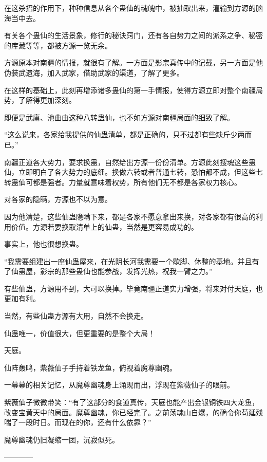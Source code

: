 \begin{this_body}
在这杀招的作用下，种种信息从各个蛊仙的魂魄中，被抽取出来，灌输到方源的脑海当中去。

有关各个蛊仙的生活景象，修行的秘诀窍门，还有各自势力之间的派系之争、秘密的库藏等等，都被方源一览无余。

方源原本对南疆的情报，就很有了解。一方面是影宗真传中的记载，另一方面是他伪装武遗海，加入武家，借助武家的渠道，了解了更多。

在这样的基础上，此刻再增添诸多蛊仙的第一手情报，使得方源立即对整个南疆局势，了解得更加深刻。

即便是武庸、池曲由这种八转蛊仙，也不如方源对南疆局面的细致了解。

“这么说来，各家给我提供的仙蛊清单，都是正确的，只不过都有些缺斤少两而已。”

南疆正道各大势力，要求换蛊，自然给出方源一份份清单。方源此刻搜魂这些蛊仙，立即明白了各大势力的底细。换做六转或者普通七转，恐怕都不成，但这些七转蛊仙可都是强者。力量就意味着权势，所有他们无不都是各家权力核心。

对各家的隐瞒，方源也不以为意。

因为他清楚，这些仙蛊隐瞒下来，都是各家不愿意拿出来换，对各家都有很高的利用价值。方源若要换取清单上的仙蛊，当然是更容易成功的。

事实上，他也很想换蛊。

“我需要组建出一座仙蛊屋来，在光阴长河我需要一个歇脚、休整的基地。并且有了仙蛊屋，影宗的那些蛊仙也能参战，发挥光热，祝我一臂之力。”

有些仙蛊，方源用不到，大可以换掉。毕竟南疆正道实力增强，将来对付天庭，也更加有利。

当然，有些仙蛊方源有大用，自然不会换走。

仙蛊唯一，价值很大，但更重要的是整个大局！

天庭。

仙阵轰鸣，紫薇仙子手持着铁龙鱼，俯视着魔尊幽魂。

一幕幕的相关记忆，从魔尊幽魂身上涌现而出，浮现在紫薇仙子的眼前。

紫薇仙子微微带笑：“有了这部分的食道真传，天庭也能产出金银铜铁四大龙鱼，改变宝黄天中的局面。魔尊幽魂，你已经完了。之前荡魂山自爆，的确令你苟延残喘了一段时日。而现在的你，还有什么依靠？”

魔尊幽魂仍旧凝缩一团，沉寂似死。

------------

\end{this_body}

